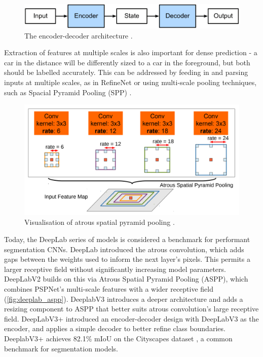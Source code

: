 \documentclass[a4paper,12pt]{report}
\begin{document}
\begin{figure}[t]
    \centering
    \includegraphics[width=\textwidth]{res/encoder-decoder.png}
    \caption{The encoder-decoder architecture \cite{zhang_dive_2019}.}
    \label{fig:encoder_decoder}
\end{figure}

Extraction of features at multiple scales is also important for dense prediction - a car in the distance will be differently sized to a car in the foreground, but both should be labelled accurately. This can be addressed by feeding in and parsing inputs at multiple scales, as in RefineNet \cite{lin_refinenet_2016} or using multi-scale pooling techniques, such as Spacial Pyramid Pooling (SPP) \cite{he_spatial_2014}.

\begin{figure}[h]
    \centering
    \includegraphics[scale=0.5]{res/deeplab-aspp.png}
    \caption{Visualisation of atrous spatial pyramid pooling \cite{chen_deeplab_2017}.}
    \label{fig:deeplab_aspp}
\end{figure}

Today, the DeepLab series of models is considered a benchmark for performant segmentation CNNs. DeepLab \cite{chen_semantic_2016} introduced the atrous convolution, which adds gaps between the weights used to inform the next layer’s pixels. This permits a larger receptive field without significantly increasing model parameters. DeepLabV2 \cite{chen_deeplab_2017} builds on this via Atrous Spatial Pyramid Pooling (ASPP), which combines PSPNet’s \cite{zhao_pyramid_2017} multi-scale features with a wider receptive field (\autoref{fig:deeplab_aspp}). DeeplabV3 \cite{chen_rethinking_2017} introduces a deeper architecture and adds a resizing component to ASPP that better suits atrous convolution’s large receptive field. DeepLabV3+ \cite{chen_encoder-decoder_2018} introduced an encoder-decoder design with DeepLabV3 as the encoder, and applies a simple decoder to better refine class boundaries. DeeplabV3+ achieves 82.1\% mIoU on the Cityscapes dataset \cite{cordts_cityscapes_2016}, a common benchmark for segmentation models.
\end{document}
